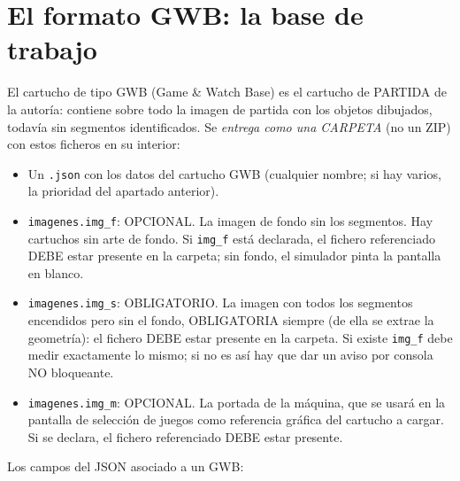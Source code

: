 \section{El formato GWB: la base de trabajo}
\label{sec:A02GWB}


El cartucho de tipo GWB (Game \& Watch Base) es el cartucho de PARTIDA de la autoría: contiene sobre todo la imagen de partida con los objetos dibujados, todavía sin
segmentos identificados. Se \emph{entrega como una CARPETA} (no un ZIP) con estos ficheros en su interior:

\begin{itemize}
	\item Un \texttt{.json} con los datos del cartucho GWB (cualquier nombre; si hay
	varios, la prioridad del apartado anterior).
	
	\item \texttt{imagenes.img\_f}: OPCIONAL. La imagen de fondo sin los segmentos. Hay 
	cartuchos sin arte de fondo. Si \texttt{img\_f} está declarada, el 	fichero referenciado
	DEBE estar presente en la carpeta; sin fondo, el simulador pinta la pantalla en blanco.
	
	\item \texttt{imagenes.img\_s}: OBLIGATORIO. La imagen con todos los segmentos encendidos pero sin 
	el fondo, OBLIGATORIA siempre (de ella se extrae la geometría): el fichero DEBE estar presente en la carpeta. Si existe \texttt{img\_f}
	debe medir exactamente lo mismo; si no es así hay que dar un aviso por consola NO bloqueante.
	
	\item \texttt{imagenes.img\_m}: OPCIONAL. La portada de la máquina, que se usará en la
	pantalla de selección de juegos como referencia gráfica del cartucho a cargar. Si se declara, el fichero referenciado DEBE estar presente.
\end{itemize}

Los campos del JSON asociado a un GWB:

